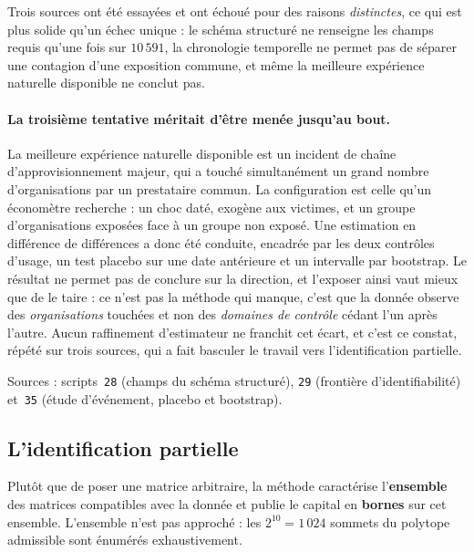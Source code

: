 \documentclass[12pt,a4paper]{article}
\theoremstyle{definition}
\begin{document}
Trois sources ont été essayées et ont échoué pour des raisons \emph{distinctes},
ce qui est plus solide qu'un échec unique : le schéma structuré ne renseigne les
champs requis qu'une fois sur $10\,591$, la chronologie temporelle ne permet pas
de séparer une contagion d'une exposition commune, et même la meilleure expérience
naturelle disponible ne conclut pas.

\paragraph{La troisième tentative méritait d'être menée jusqu'au bout.} La
meilleure expérience naturelle disponible est un incident de chaîne
d'approvisionnement majeur, qui a touché simultanément un grand nombre
d'organisations par un prestataire commun. La configuration est celle qu'un
économètre recherche : un choc daté, exogène aux victimes, et un groupe
d'organisations exposées face à un groupe non exposé. Une estimation en différence
de différences a donc été conduite, encadrée par les deux contrôles d'usage, un
test placebo sur une date antérieure et un intervalle par bootstrap. Le résultat
ne permet pas de conclure sur la direction, et l'exposer ainsi vaut mieux que de
le taire : ce n'est pas la méthode qui manque, c'est que la donnée observe des
\emph{organisations} touchées et non des \emph{domaines de contrôle} cédant l'un
après l'autre. Aucun raffinement d'estimateur ne franchit cet écart, et c'est ce
constat, répété sur trois sources, qui a fait basculer le travail vers
l'identification partielle.

\vspace{4pt}
\noindent Sources : scripts~\texttt{28} (champs du schéma structuré),
\texttt{29} (frontière d'identifiabilité) et~\texttt{35} (étude d'événement,
placebo et bootstrap).

\subsection{L'identification partielle}
\label{ss:partielle}

Plutôt que de poser une matrice arbitraire, la méthode caractérise
l'\textbf{ensemble} des matrices compatibles avec la donnée et publie le capital
en \textbf{bornes} sur cet ensemble. L'ensemble n'est pas approché : les
$2^{10} = 1\,024$ sommets du polytope admissible sont énumérés exhaustivement.
\end{document}
